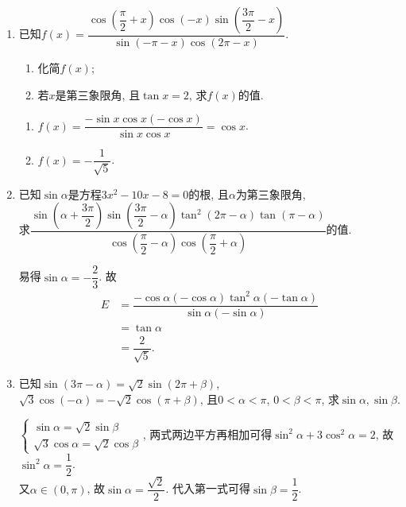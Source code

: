 \begin{enumerate}
    \item 已知$f\left(x\right)=\dfrac{\cos\left(\dfrac{\pi}{2}+x\right)\cos\left(-x\right)\sin\left(\dfrac{3\pi}{2}-x\right)}{\sin\left(-\pi-x\right)\cos\left(2\pi-x\right)}$. 
    \begin{enumerate}[(1)]
    \item 化简$f\left(x\right)$; 
    \item 若$x$是第三象限角, 且$\tan{x}=2$, 求$f\left(x\right)$的值. 
    \end{enumerate}
    \begin{jieda}
    \begin{enumerate}[(1)]
    \item $f\left(x\right)=\dfrac{-\sin{x}\cos{x}\left(-\cos{x}\right)}{\sin{x}\cos{x}}=\cos{x}$. 
    \item $f\left(x\right)=-\dfrac{1}{\sqrt{5}}$. 
    \end{enumerate}
    \end{jieda}
    
    \item 已知$\sin\alpha$是方程$3x^2-10x-8=0$的根, 且$\alpha$为第三象限角, \\
    求$\dfrac{\sin\left(\alpha+\dfrac{3\pi}{2}\right)\sin\left(\dfrac{3\pi}{2}-\alpha\right)\tan^2\left(2\pi-\alpha\right)\tan\left(\pi-\alpha\right)}
    {\cos\left(\dfrac{\pi}{2}-\alpha\right)\cos\left(\dfrac{\pi}{2}+\alpha\right)}$的值. 
    \begin{jieda}
    易得$\sin\alpha=-\dfrac{2}{3}$. 
    故
    \begin{align*}
    E & = \dfrac{-\cos\alpha\left(-\cos\alpha\right)\tan^2\alpha\left(-\tan\alpha\right)}{\sin\alpha\left(-\sin\alpha\right)}\\
    & = \tan\alpha\\
    & = \dfrac{2}{\sqrt{5}}.
    \end{align*}
    \end{jieda}

    \item 已知$\sin\left(3\pi-\alpha\right)=\sqrt2\sin\left(2\pi+\beta\right)$, $\sqrt3\cos\left(-\alpha\right)=-\sqrt2\cos\left(\pi+\beta\right)$, 
    且$0<\alpha<\pi$, $0<\beta<\pi$, 求$\sin\alpha,\sin\beta$. 
    \begin{jieda}
    $\begin{cases}
    \sin\alpha=\sqrt{2}\sin\beta\\
    \sqrt{3}\cos\alpha=\sqrt{2}\cos\beta
    \end{cases}$, 两式两边平方再相加可得$\sin^2\alpha+3\cos^2\alpha=2$, 故$\sin^2\alpha=\dfrac{1}{2}$. \\
    又$\alpha\in\left(0,\pi\right)$, 故$\sin\alpha=\dfrac{\sqrt{2}}{2}$. 
    代入第一式可得$\sin\beta=\dfrac{1}{2}$. 
    \end{jieda}


\end{enumerate}
